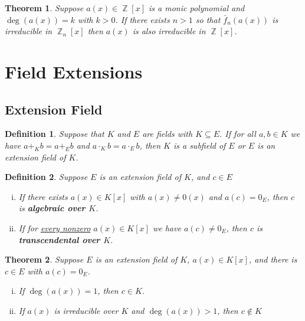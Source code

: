 \documentclass[letterpaper, 12pt]{article}
\DeclareMathOperator{\Z}{\mathbb{Z}}
\newtheorem{defn}{Definition}
\newtheorem{thm}{Theorem}
\begin{document}
			\setcounter{thm}{36}
			\begin{thm}
			Suppose $a(x) \in \Z[x]$ is a monic polynomial and $\deg(a(x)) = k$ with $k > 0$. 
			If there exists $n > 1$ so that $\bar{f}_{n}(a(x))$ is irreducible in $\Z_{n}[x]$ then $a(x)$ is also irreducible in $\Z[x]$.
			\end{thm}

	\section{Field Extensions}
	\label{sec:field_extensions}
		\setcounter{defn}{0}
		\setcounter{thm}{0}

		\subsection{Extension Field}
		\label{sec:extension_field}
			\begin{defn}
			Suppose that $K$ and $E$ are fields with $K \subseteq E$.
			If for all $a,b \in K$ we have $a +_{K} b = a +_{E} b$ and $a \cdot_{K} b = a \cdot_{E} b$, then $K$ is a subfield of $E$ or $E$ is an extension field of $K$.
			\end{defn}

			\begin{defn}
			Suppose $E$ is an extension field of $K$, and $c \in E$
				\begin{enumerate}[(i)]
				\item If there exists $a(x) \in K[x]$ with $a(x) \neq 0(x)$ and $a(c) = 0_{E}$, then $c$ is \textbf{\textit{algebraic over $K$}}.
				\item If for \underline{every nonzero} $a(x) \in K[x]$ we have $a(c) \neq 0_{E}$, then $c$ is \textbf{\textit{transcendental over $K$}}.
				\end{enumerate}
			\end{defn}

			\setcounter{thm}{3}
			\begin{thm}
			Suppose $E$ is an extension field of $K$, $a(x) \in K[x]$, and there is $c \in E$ with $a(c) = 0_{E}$.
				\begin{enumerate}[(i)]
				\item If $\deg(a(x)) = 1$, then $c \in K$.
				\item If $a(x)$ is irreducible over $K$ and $\deg(a(x)) > 1$, then $c \not\in K$
				\end{enumerate}
			\end{thm}
\end{document}
